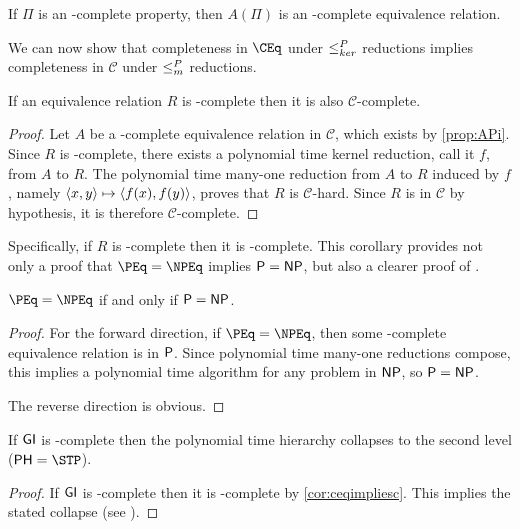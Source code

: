 \begin{corollary}
  If $\Pi$ is an \NP-complete property, then $A(\Pi)$ is an \NP-complete equivalence relation.
\end{corollary}

We can now show that completeness in $\CEq$ under $\kr$ reductions implies completeness in $\mathcal{C}$ under $\mor$ reductions.

\begin{corollary}\label{cor:ceqimpliesc}
  If an equivalence relation $R$ is \CEq-complete then it is also $\mathcal{C}$-complete.
\end{corollary}
\begin{proof}
  Let $A$ be a \CEq-complete equivalence relation in $\mathcal{C}$, which exists by \autoref{prop:APi}.
  Since $R$ is \CEq-complete, there exists a polynomial time kernel reduction, call it $f$, from $A$ to $R$.
  The polynomial time many-one reduction from $A$ to $R$ induced by $f$, namely $\pair{x}{y}\mapsto\pair{f(x)}{f(y)}$, proves that $R$ is $\mathcal{C}$-hard.
  Since $R$ is in $\mathcal{C}$ by hypothesis, it is therefore $\mathcal{C}$-complete.
\end{proof}

Specifically, if $R$ is \NPEq-complete then it is \NP-complete.
This corollary provides not only a proof that $\PEq=\NPEq$ implies $\P=\NP$, but also a clearer proof of \cite[Proposition~8.1]{bcffm}.

\begin{corollary}
  $\PEq=\NPEq$ if and only if $\P=\NP$.
\end{corollary}
\begin{proof}
  For the forward direction, if $\PEq=\NPEq$, then some \NP-complete equivalence relation is in $\P$.
  Since polynomial time many-one reductions compose, this implies a polynomial time algorithm for any problem in $\NP$, so $\P=\NP$.

  The reverse direction is obvious.
\end{proof}

\begin{proposition}
  If $\GI$ is \NPEq-complete then the polynomial time hierarchy collapses to the second level ($\PH=\STP$).
\end{proposition}
\begin{proof}
  If $\GI$ is \NPEq-complete then it is \NP-complete by \autoref{cor:ceqimpliesc}.
  This implies the stated collapse (see \cite{schoning87}).
\end{proof}


